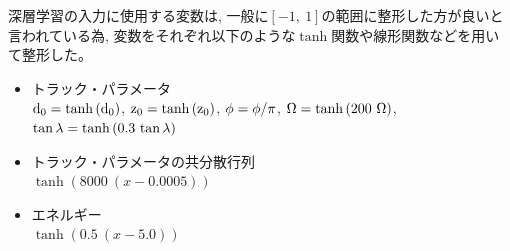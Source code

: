 深層学習の入力に使用する変数は, 一般に$[-1,\ 1]$の範囲に整形した方が良いと言われている為, 変数をそれぞれ以下のような$\tanh$関数や線形関数などを用いて整形した。

\begin{itemize}
 \item トラック・パラメータ\\
 ${\rm d_0} = \tanh{({\rm d_0})}$,
 ${\rm z_0} = \tanh{({\rm z_0})}$,
 ${\rm \phi} = {\rm \phi}/\pi$,
 ${\rm \Omega} = \tanh{(200\ {\rm \Omega})}$,
 ${\rm \tan{\lambda}} = \tanh{(0.3\ {\rm \tan{\lambda}})}$
 \item トラック・パラメータの共分散行列\\
 $\tanh{(8000\ (x-0.0005))}$
 \item エネルギー\\
 $\tanh{(0.5\ (x-5.0))}$
\end{itemize}

